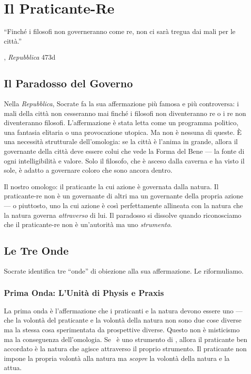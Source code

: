\chapter{Il Praticante-Re}

\epigraph{``Finch\'e i filosofi non governeranno come re, non ci sar\`a tregua
dai mali per le citt\`a.''}{\textcite{plato1997complete}, \emph{Repubblica} 473d}

\section{Il Paradosso del Governo}

Nella \emph{Repubblica}, Socrate fa la sua affermazione pi\`u famosa
e pi\`u controversa: i mali della citt\`a non cesseranno mai finch\'e
i filosofi non diventeranno re o i re non diventeranno filosofi.
L'affermazione \`e stata letta come un programma politico, una fantasia
elitaria o una provocazione utopica. Ma non \`e nessuna di queste. \`E
una necessit\`a strutturale dell'omologia: se la citt\`a \`e l'anima
in grande, allora il governante della citt\`a deve essere colui che vede
la Forma del Bene --- la fonte di ogni intelligibilit\`a e valore. Solo
il filosofo, che \`e asceso dalla caverna e ha visto il sole, \`e adatto
a governare coloro che sono ancora dentro.

Il nostro omologo: il praticante la cui azione \`e governata dalla
natura. Il praticante-re non \`e un governante di altri ma un governante
della propria azione --- o piuttosto, uno la cui azione \`e cos\`i
perfettamente allineata con la natura che la natura governa \emph{attraverso}
di lui. Il paradosso si dissolve quando riconosciamo che il praticante-re
non \`e un'autorit\`a ma uno \emph{strumento}.

\section{Le Tre Onde}

Socrate identifica tre ``onde'' di obiezione alla sua affermazione. Le
riformuliamo.

\subsection{Prima Onda: L'Unit\`a di Physis e Praxis}

La prima onda \`e l'affermazione che i praticanti e la natura devono
essere uno --- che la volont\`a del praticante e la volont\`a della
natura non sono due cose diverse ma la stessa cosa sperimentata da
prospettive diverse. Questo non \`e misticismo ma la conseguenza
dell'omologia. Se \praxis\ \`e uno strumento di \physis, allora il
praticante ben accordato \`e la natura che agisce attraverso il proprio
strumento. Il praticante non impone la propria volont\`a alla natura ma
\emph{scopre} la volont\`a della natura e la attua.


